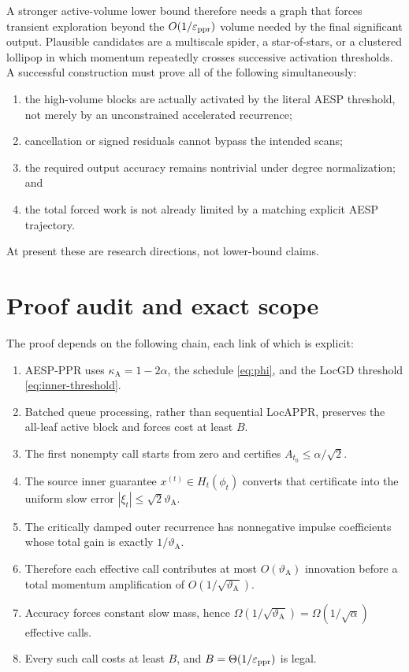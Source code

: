 \documentclass[11pt]{article}
\begin{document}
A stronger active-volume lower bound therefore needs a graph that forces
transient exploration beyond the $O(1/\varepsilon_{\mathrm{ppr}})$ volume needed by the final
significant output.  Plausible candidates are a multiscale spider, a
star-of-stars, or a clustered lollipop in which momentum repeatedly crosses
successive activation thresholds.  A successful construction must prove all
of the following simultaneously:
\begin{enumerate}[leftmargin=*]
\item the high-volume blocks are actually activated by the literal AESP
      threshold, not merely by an unconstrained accelerated recurrence;
\item cancellation or signed residuals cannot bypass the intended scans;
\item the required output accuracy remains nontrivial under degree
      normalization; and
\item the total forced work is not already limited by a matching explicit
      AESP trajectory.
\end{enumerate}
At present these are research directions, not lower-bound claims.

\section{Proof audit and exact scope}
\label{sec:audit}

The proof depends on the following chain, each link of which is explicit:
\begin{enumerate}[leftmargin=*]
\item AESP-PPR uses $\kappa_{\mathrm A}=1-2\alpha$, the schedule \cref{eq:phi}, and the
      LocGD threshold \cref{eq:inner-threshold}.
\item Batched queue processing, rather than sequential LocAPPR, preserves the
      all-leaf active block and forces cost at least $B$.
\item The first nonempty call starts from zero and certifies
      $A_{t_0}\leq\alpha/\sqrt2$.
\item The source inner guarantee $x^{(t)}\in H_t(\phi_t)$ converts that
      certificate into the uniform slow error
      $|\xi_t|\leq\sqrt2\vartheta_{\mathrm A}$.
\item The critically damped outer recurrence has nonnegative impulse
      coefficients whose total gain is exactly $1/\vartheta_{\mathrm A}$.
\item Therefore each effective call contributes at most $O(\vartheta_{\mathrm A})$ innovation
      before a total momentum amplification of \(O(1/\sqrt{\vartheta_{\mathrm A}})\).
\item Accuracy forces constant slow mass, hence
      \(\Omega(1/\sqrt{\vartheta_{\mathrm A}})=\Omega(1/\sqrt\alpha)\) effective calls.
\item Every such call costs at least $B$, and $B=\Theta(1/\varepsilon_{\mathrm{ppr}})$ is legal.
\end{enumerate}
\end{document}

